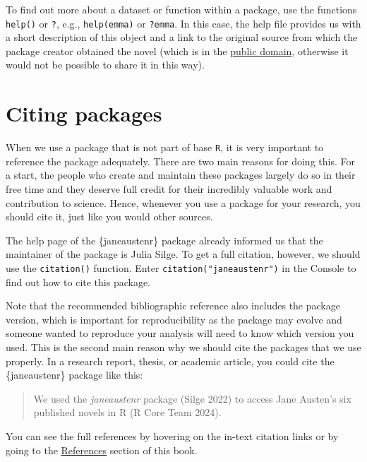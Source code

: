 \documentclass[
  letterpaper,
  DIV=11,
  numbers=noendperiod,
  oneside]{scrreprt}
\begin{document}
To find out more about a dataset or function within a package, use the
functions \texttt{help()} or \texttt{?}, e.g., \texttt{help(emma)} or
\texttt{?emma}. In this case, the help file provides us with a short
description of this object and a link to the original source from which
the package creator obtained the novel (which is in the
\href{https://www.gutenberg.org/help/faq.html\#what-books-does-project-gutenberg-publish}{public
domain}, otherwise it would not be possible to share it in this way).

\section{Citing packages}\label{citing-packages}

When we use a package that is not part of base \texttt{R}, it is very
important to reference the package adequately. There are two main
reasons for doing this. For a start, the people who create and maintain
these packages largely do so in their free time and they deserve full
credit for their incredibly valuable work and contribution to science.
Hence, whenever you use a package for your research, you should cite it,
just like you would other sources.

The help page of the \{janeaustenr\} package already informed us that
the maintainer of the package is Julia Silge. To get a full citation,
however, we should use the \texttt{citation()} function. Enter
\texttt{citation("janeaustenr")} in the Console to find out how to cite
this package.

Note that the recommended bibliographic reference also includes the
package version, which is important for reproducibility as the package
may evolve and someone wanted to reproduce your analysis will need to
know which version you used. This is the second main reason why we
should cite the packages that we use properly. In a research report,
thesis, or academic article, you could cite the \{janeaustenr\} package
like this:

\begin{quote}
We used the \emph{janeaustenr} package (Silge 2022) to access Jane
Austen's six published novels in R (R Core Team 2024).
\end{quote}

You can see the full references by hovering on the in-text citation
links or by going to the
\href{https://elenlefoll.github.io/RstatsTextbook/references.html}{References}
section of this book.

\end{document}
